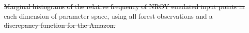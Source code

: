 \documentclass[esd, article]{copernicus} %
\providecommand{\DIFdel}[1]{{\protect\color{red}\sout{#1}}}                      %
\providecommand{\DIFdelbegin}{} %
\providecommand{\DIFdelend}{} %
\begin{document}
\DIFdelbegin %
{%
\DIFdel{Marginal histograms of the relative frequency of NROY emulated input points in each dimension of parameter space, using all forest observations and a discrepancy function for the Amazon.}}

\DIFdelend %



\end{document}
